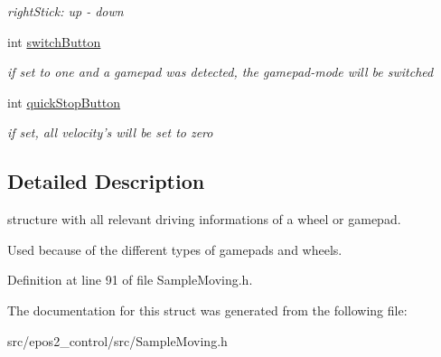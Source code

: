 \begin{DoxyCompactItemize}
\begin{DoxyCompactList}\small\item\em right\-Stick\-: up -\/ down \end{DoxyCompactList}\item 
\hypertarget{structSampleMoving_1_1axesStruct_a1293fa37319bebb1d4ae0a0303e3de72}{int \hyperlink{structSampleMoving_1_1axesStruct_a1293fa37319bebb1d4ae0a0303e3de72}{switch\-Button}}\label{structSampleMoving_1_1axesStruct_a1293fa37319bebb1d4ae0a0303e3de72}

\begin{DoxyCompactList}\small\item\em if set to one and a gamepad was detected, the gamepad-\/mode will be switched \end{DoxyCompactList}\item 
\hypertarget{structSampleMoving_1_1axesStruct_af87224bdee13b95fcf20570d35ea11ea}{int \hyperlink{structSampleMoving_1_1axesStruct_af87224bdee13b95fcf20570d35ea11ea}{quick\-Stop\-Button}}\label{structSampleMoving_1_1axesStruct_af87224bdee13b95fcf20570d35ea11ea}

\begin{DoxyCompactList}\small\item\em if set, all velocity's will be set to zero \end{DoxyCompactList}\end{DoxyCompactItemize}


\subsection{Detailed Description}
structure with all relevant driving informations of a wheel or gamepad. 

Used because of the different types of gamepads and wheels. 

Definition at line 91 of file Sample\-Moving.\-h.



The documentation for this struct was generated from the following file\-:\begin{DoxyCompactItemize}
\item 
src/epos2\-\_\-control/src/Sample\-Moving.\-h\end{DoxyCompactItemize}
